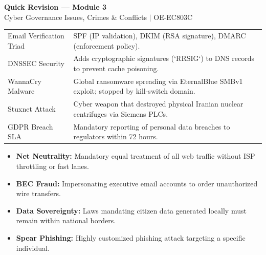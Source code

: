 \documentclass[12pt,a4paper]{article}
\renewcommand{\arraystretch}{1.45}
\begin{document}
\newpage
\begin{center}
  {\large\bfseries\color{myred} Quick Revision --- Module 3}\\[3pt]
  {\small\color{mydark} Cyber Governance Issues, Crimes \& Conflicts $|$ OE-EC803C}
\end{center}
\noindent{\color{myred}\rule{\linewidth}{1.2pt}}
\vspace{4pt}

\begin{tcolorbox}[formulabox, title={\textbf{Key Concepts and Metrics at a Glance}}]
\renewcommand{\arraystretch}{1.35}
\begin{tabularx}{\linewidth}{B{4.8cm} X}
Email Verification Triad & SPF (IP validation), DKIM (RSA signature), DMARC (enforcement policy). \\[3pt]
DNSSEC Security & Adds cryptographic signatures (`RRSIG`) to DNS records to prevent cache poisoning. \\[3pt]
WannaCry Malware & Global ransomware spreading via EternalBlue SMBv1 exploit; stopped by kill-switch domain. \\[3pt]
Stuxnet Attack & Cyber weapon that destroyed physical Iranian nuclear centrifuges via Siemens PLCs. \\[3pt]
GDPR Breach SLA & Mandatory reporting of personal data breaches to regulators within 72 hours.
\end{tabularx}
\end{tcolorbox}

\begin{tcolorbox}[defbox, title={\textbf{One-Line Definitions}}]
\begin{itemize}[leftmargin=*, itemsep=2pt, topsep=0pt]
  \item \textbf{Net Neutrality:} Mandatory equal treatment of all web traffic without ISP throttling or fast lanes.
  \item \textbf{BEC Fraud:} Impersonating executive email accounts to order unauthorized wire transfers.
  \item \textbf{Data Sovereignty:} Laws mandating citizen data generated locally must remain within national borders.
  \item \textbf{Spear Phishing:} Highly customized phishing attack targeting a specific individual.
\end{itemize}
\end{tcolorbox}
\end{document}
